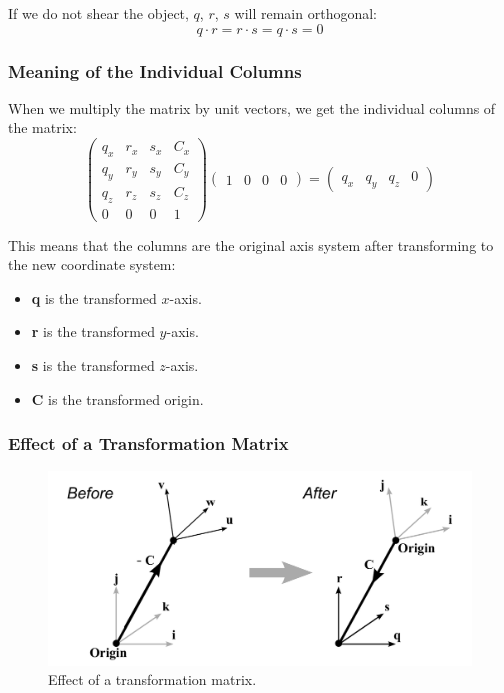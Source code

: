 \documentclass[11pt]{article}
\begin{document}
If we do not shear the object, $q$, $r$, $s$ will remain orthogonal:
\[
  q \cdot r = r \cdot s = q \cdot s = 0  
\]

\subsubsection{Meaning of the Individual Columns}
When we multiply the matrix by unit vectors, we get the individual columns of the matrix:
\[
  \begin{pmatrix}
    q_x & r_x & s_x & C_x \\
    q_y & r_y & s_y & C_y \\
    q_z & r_z & s_z & C_z \\
    0 & 0 & 0 & 1
  \end{pmatrix}
  \begin{pmatrix} 1 & 0 & 0 & 0 \end{pmatrix}
  =
  \begin{pmatrix} q_x & q_y & q_z & 0 \end{pmatrix}
\]

This means that the columns are the original axis system after transforming to the new coordinate system:
\begin{itemize}
  \item \textbf{q} is the transformed $x$-axis.
  \item \textbf{r} is the transformed $y$-axis.
  \item \textbf{s} is the transformed $z$-axis.
  \item \textbf{C} is the transformed origin.
\end{itemize}

\subsubsection{Effect of a Transformation Matrix}
\begin{figure}[htb!]
  \caption{Effect of a transformation matrix.}
  \includegraphics[scale=0.2]{effecttransform}
  \centering
\end{figure}
\end{document}
